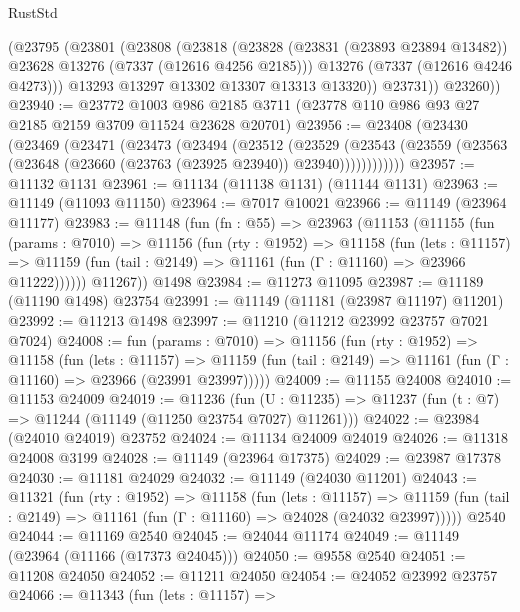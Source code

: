 \begin{lexlean}{RustStd}
\begin{coremodule}
          (@23795
            (@23801
              (@23808
                (@23818
                  (@23828
                    (@23831 (@23893 @23894 @13482))
                    @23628
                    @13276
                    (@7337 (@12616 @4256 @2185)))
                  @13276
                  (@7337 (@12616 @4246 @4273)))
                @13293
                @13297
                @13302
                @13307
                @13313
                @13320))
            @23731))
        @23260))
@23940 := @23772
    @1003
    @986
    @2185
    @3711
    (@23778 @110 @986 @93 @27 @2185 @2159 @3709 @11524 @23628 @20701)
@23956 := @23408
    (@23430
      (@23469
        (@23471
          (@23473
            (@23494
              (@23512
                (@23529
                  (@23543
                    (@23559 (@23563 (@23648 (@23660 (@23763 (@23925 @23940)) @23940))))))))))))
@23957 := @11132 @1131
@23961 := @11134 (@11138 @1131) (@11144 @1131)
@23963 := @11149 (@11093 @11150)
@23964 := @7017 @10021
@23966 := @11149 (@23964 @11177)
@23983 := @11148
    (fun (fn : @55) =>
    @23963
      (@11153
        (@11155
          (fun (params : @7010) =>
          @11156
            (fun (rty : @1952) =>
            @11158
              (fun (lets : @11157) =>
              @11159 (fun (tail : @2149) => @11161 (fun (Γ : @11160) => @23966 @11222))))))
        @11267))
    @1498
@23984 := @11273 @11095
@23987 := @11189 (@11190 @1498) @23754
@23991 := @11149 (@11181 (@23987 @11197) @11201)
@23992 := @11213 @1498
@23997 := @11210 (@11212 @23992 @23757 @7021 @7024)
@24008 := fun (params : @7010) =>
  @11156
    (fun (rty : @1952) =>
    @11158
      (fun (lets : @11157) =>
      @11159 (fun (tail : @2149) => @11161 (fun (Γ : @11160) => @23966 (@23991 @23997)))))
@24009 := @11155 @24008
@24010 := @11153 @24009
@24019 := @11236
    (fun (U : @11235) => @11237 (fun (t : @7) => @11244 (@11149 (@11250 @23754 @7027) @11261)))
@24022 := @23984 (@24010 @24019) @23752
@24024 := @11134 @24009 @24019
@24026 := @11318 @24008 @3199
@24028 := @11149 (@23964 @17375)
@24029 := @23987 @17378
@24030 := @11181 @24029
@24032 := @11149 (@24030 @11201)
@24043 := @11321
    (fun (rty : @1952) =>
    @11158
      (fun (lets : @11157) =>
      @11159 (fun (tail : @2149) => @11161 (fun (Γ : @11160) => @24028 (@24032 @23997)))))
    @2540
@24044 := @11169 @2540
@24045 := @24044 @11174
@24049 := @11149 (@23964 (@11166 (@17373 @24045)))
@24050 := @9558 @2540
@24051 := @11208 @24050
@24052 := @11211 @24050
@24054 := @24052 @23992 @23757
@24066 := @11343
    (fun (lets : @11157) =>

\end{coremodule}
\end{lexlean}
